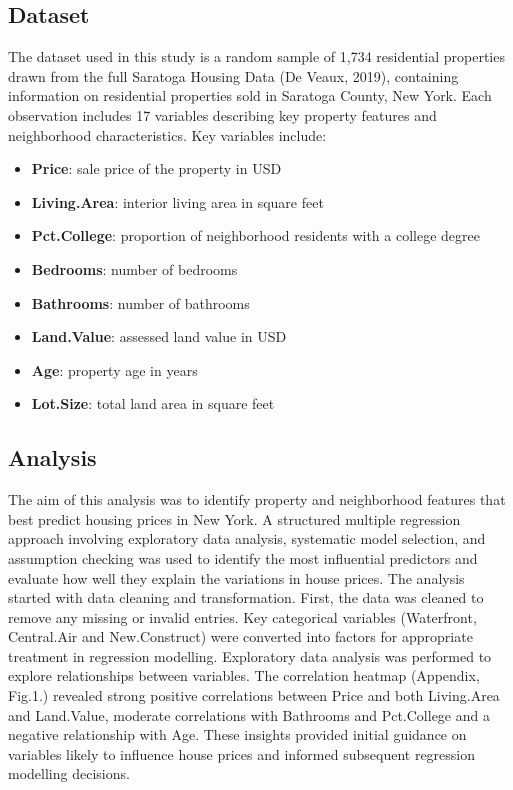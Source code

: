 \documentclass[letterpaper,9pt,twocolumn,twoside,]{pinp}
\providecommand{\tightlist}{%
  \setlength{\itemsep}{0pt}\setlength{\parskip}{0pt}}
\begin{document}
\subsection{Dataset}\label{dataset}

The dataset used in this study is a random sample of 1,734 residential
properties drawn from the full Saratoga Housing Data (De Veaux, 2019),
containing information on residential properties sold in Saratoga
County, New York. Each observation includes 17 variables describing key
property features and neighborhood characteristics. Key variables
include:

\begin{itemize}
\tightlist
\item
  \textbf{Price}: sale price of the property in USD
\item
  \textbf{Living.Area}: interior living area in square feet
\item
  \textbf{Pct.College}: proportion of neighborhood residents with a
  college degree
\item
  \textbf{Bedrooms}: number of bedrooms
\item
  \textbf{Bathrooms}: number of bathrooms
\item
  \textbf{Land.Value}: assessed land value in USD
\item
  \textbf{Age}: property age in years
\item
  \textbf{Lot.Size}: total land area in square feet
\end{itemize}

\subsection{Analysis}\label{analysis}

The aim of this analysis was to identify property and neighborhood
features that best predict housing prices in New York. A structured
multiple regression approach involving exploratory data analysis,
systematic model selection, and assumption checking was used to identify
the most influential predictors and evaluate how well they explain the
variations in house prices. The analysis started with data cleaning and
transformation. First, the data was cleaned to remove any missing or
invalid entries. Key categorical variables (Waterfront, Central.Air and
New.Construct) were converted into factors for appropriate treatment in
regression modelling. Exploratory data analysis was performed to explore
relationships between variables. The correlation heatmap (Appendix,
Fig.1.) revealed strong positive correlations between Price and both
Living.Area and Land.Value, moderate correlations with Bathrooms and
Pct.College and a negative relationship with Age. These insights
provided initial guidance on variables likely to influence house prices
and informed subsequent regression modelling decisions.
\end{document}
